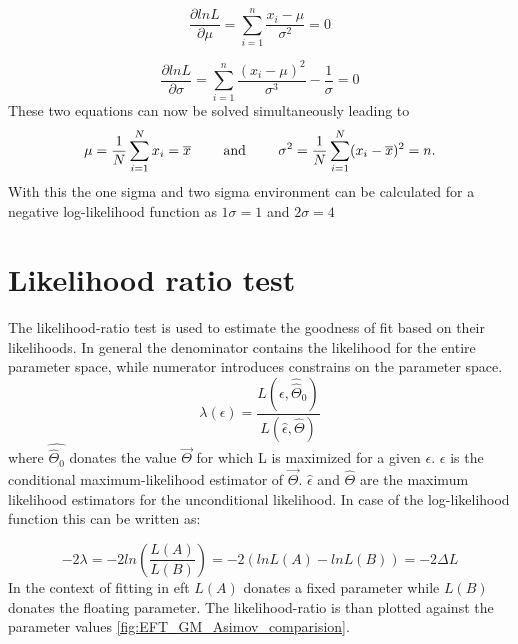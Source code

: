 \documentclass[../Bachelorarbeit.tex]{subfiles}
\begin{document}
\begin{equation}
    \frac{\partial ln L}{\partial \mu} = \sum_{i = 1}^{n} \frac{x_{i}-\mu}{\sigma^{2}} = 0
\end{equation}

\begin{equation}
    \frac{\partial ln L}{\partial \sigma} = \sum_{i = 1}^{n} \frac{(x_{i}-\mu)^{2}}{\sigma^{3}} - \frac{1}{\sigma} = 0
\end{equation}
These two equations can now be solved simultaneously leading to
\begin{equation}
    \mu = \frac{1}{N} \sum^{N}_{i = 1} x_{i} = \overline{x} \qquad \textnormal{ and } \qquad \sigma^{2} = \frac{1}{N} \sum^{N}_{i = 1} (x_{i}-\overline{x})^{2} = n.
\end{equation}
With this the one sigma and two sigma environment can be calculated for a negative log-likelihood function as $1\sigma=1$ and $2\sigma=4$ \cite{Erdmann.2020}

\section{Likelihood ratio test}
The likelihood-ratio test\cite{Cowan.2011} is used to estimate the goodness of fit based on their likelihoods. In general the denominator contains the likelihood for the entire parameter space, while numerator introduces constrains on the parameter space.
\begin{equation}
    \lambda(\epsilon) = \frac{L(\epsilon,\hat{\hat{{\Theta}}}_{0})}{L(\hat{\epsilon},\hat{\Theta})}
\end{equation}
where $\hat{\hat{\Theta}_{0}}$ donates the value $\overrightarrow{\Theta}$ for which L is maximized for a given $\epsilon$. $\epsilon$ is the
conditional maximum-likelihood estimator of $\overrightarrow{\Theta}$. $\hat{\epsilon}$ and $\hat{\Theta}$ are the maximum likelihood estimators for the unconditional likelihood.
In case of the log-likelihood function this can be written as:

\begin{equation}
    -2\lambda = -2ln \left( \frac{L(A)}{L(B)}\right)= -2(ln L(A)-ln L(B))=-2 \Delta L
\end{equation}
In the context of fitting in \acrshort{eft} $L(A)$ donates a fixed parameter while $L(B)$ donates the floating parameter. The likelihood-ratio is than plotted against the parameter values  \ref{fig:EFT_GM_Asimov_comparision}.
\end{document}
